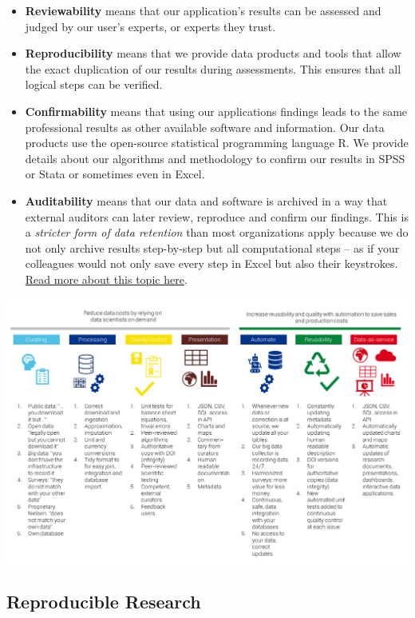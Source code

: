 \documentclass[
  a4paper,
  openany, a4paper, oneside]{book}
\providecommand{\tightlist}{%
  \setlength{\itemsep}{0pt}\setlength{\parskip}{0pt}}
\begin{document}
\begin{itemize}
\tightlist
\item
  \textbf{Reviewability} means that our application's results can be assessed and judged by our user's experts, or experts they trust.
\item
  \textbf{Reproducibility} means that we provide data products and tools that allow the exact duplication of our results during assessments. This ensures that all logical steps can be verified.
\item
  \textbf{Confirmability} means that using our applications findings leads to the same professional results as other available software and information. Our data products use the open-source statistical programming language R. We provide details about our algorithms and methodology to confirm our results in SPSS or Stata or sometimes even in Excel.
\item
  \textbf{Auditability} means that our data and software is archived in a way that external auditors can later review, reproduce and confirm our findings. This is a \emph{stricter form of data retention} than most organizations apply because we do not only archive results step-by-step but all computational steps -- as if your colleagues would not only save every step in Excel but also their keystrokes. \protect\hyperlink{reproducible-research-theory}{Read more about this topic here}.
\end{itemize}

\begin{center}\includegraphics[width=18.67in]{plots/business_development/value_chain} \end{center}

\hypertarget{reproducible-research-theory}{%
\subsection{Reproducible Research}\label{reproducible-research-theory}}
\end{document}
